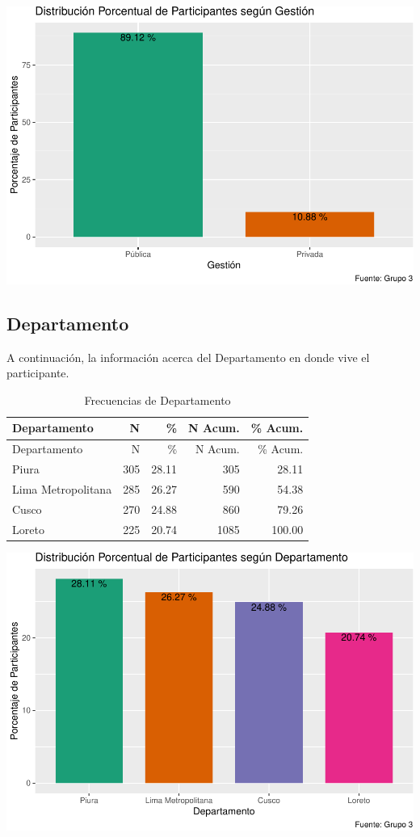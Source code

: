 \documentclass[
]{article}
\begin{document}
\includegraphics{Info_Dinix_02_files/figure-latex/30_Gest-1.pdf}

\subsection{Departamento}\label{departamento}

A continuación, la información acerca del Departamento en donde vive el
participante.

\begin{longtable}[]{@{}lrrrr@{}}
\caption{Frecuencias de Departamento}\tabularnewline
\toprule\noalign{}
Departamento & N & \% & N Acum. & \% Acum. \\
\midrule\noalign{}
\endfirsthead
\toprule\noalign{}
Departamento & N & \% & N Acum. & \% Acum. \\
\midrule\noalign{}
\endhead
\bottomrule\noalign{}
\endlastfoot
Piura & 305 & 28.11 & 305 & 28.11 \\
Lima Metropolitana & 285 & 26.27 & 590 & 54.38 \\
Cusco & 270 & 24.88 & 860 & 79.26 \\
Loreto & 225 & 20.74 & 1085 & 100.00 \\
\end{longtable}

\includegraphics{Info_Dinix_02_files/figure-latex/30_Depa-1.pdf}
\end{document}
